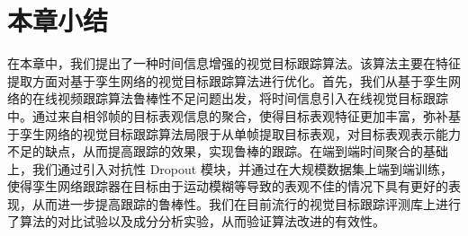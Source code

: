 \section{本章小结}
在本章中，我们提出了一种时间信息增强的视觉目标跟踪算法。该算法主要在特征提取方面对基于孪生网络的视觉目标跟踪算法进行优化。首先，我们从基于孪生网络的在线视频跟踪算法鲁棒性不足问题出发，将时间信息引入在线视觉目标跟踪中。通过来自相邻帧的目标表观信息的聚合，使得目标表观特征更加丰富，弥补基于孪生网络的视觉目标跟踪算法局限于从单帧提取目标表观，对目标表观表示能力不足的缺点，从而提高跟踪的效果，实现鲁棒的跟踪。在端到端时间聚合的基础上，我们通过引入对抗性 Dropout 模块，并通过在大规模数据集上端到端训练，使得孪生网络跟踪器在目标由于运动模糊等导致的表观不佳的情况下具有更好的表现，从而进一步提高跟踪的鲁棒性。我们在目前流行的视觉目标跟踪评测库上进行了算法的对比试验以及成分分析实验，从而验证算法改进的有效性。